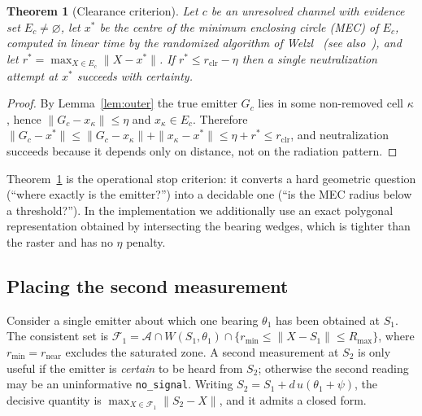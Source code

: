 \documentclass[journal,10pt]{IEEEtran}
\newtheorem{theorem}{Theorem}
\theoremstyle{definition}
\newcommand{\Rmax}{R_{\max}}
\newcommand{\bA}{\mathcal{A}}
\newcommand{\bF}{\mathcal{F}}
\begin{document}
\begin{theorem}[Clearance criterion]
\label{thm:clear}
Let $c$ be an unresolved channel with evidence set $E_c\ne\varnothing$, let $x^\ast$ be the
centre of the minimum enclosing circle (MEC) of $E_c$, computed in linear time by the randomized
algorithm of Welzl~\cite{welzl1991} (see also~\cite{megiddo1983}), and let
$r^\ast=\max_{X\in E_c}\|X-x^\ast\|$. If $r^\ast\le r_{\mathrm{clr}}-\eta$ then a single
neutralization attempt at $x^\ast$ succeeds with certainty.
\end{theorem}
\begin{proof}
By Lemma~\ref{lem:outer} the true emitter $G_c$ lies in some non-removed cell $\kappa$, hence
$\|G_c-x_\kappa\|\le\eta$ and $x_\kappa\in E_c$. Therefore
$\|G_c-x^\ast\|\le\|G_c-x_\kappa\|+\|x_\kappa-x^\ast\|\le\eta+r^\ast\le r_{\mathrm{clr}}$, and
neutralization succeeds because it depends only on distance, not on the radiation pattern.
\end{proof}

Theorem~\ref{thm:clear} is the operational stop criterion: it converts a hard geometric question
(``where exactly is the emitter?'') into a decidable one (``is the MEC radius below a threshold?'').
In the implementation we additionally use an exact polygonal representation obtained by
intersecting the bearing wedges, which is tighter than the raster and has no $\eta$ penalty.

\subsection{Placing the second measurement}

Consider a single emitter about which one bearing $\theta_1$ has been obtained at $S_1$. The
consistent set is
$\bF_1=\bA\cap W(S_1,\theta_1)\cap\{r_{\min}\le\|X-S_1\|\le\Rmax\}$, where $r_{\min}=r_{\mathrm{near}}$
excludes the saturated zone. A second measurement at $S_2$ is only useful if the emitter is
\emph{certain} to be heard from $S_2$; otherwise the second reading may be an uninformative
\texttt{no\_signal}. Writing $S_2=S_1+d\,u(\theta_1+\psi)$, the decisive quantity is
$\max_{X\in\bF_1}\|S_2-X\|$, and it admits a closed form.
\end{document}
